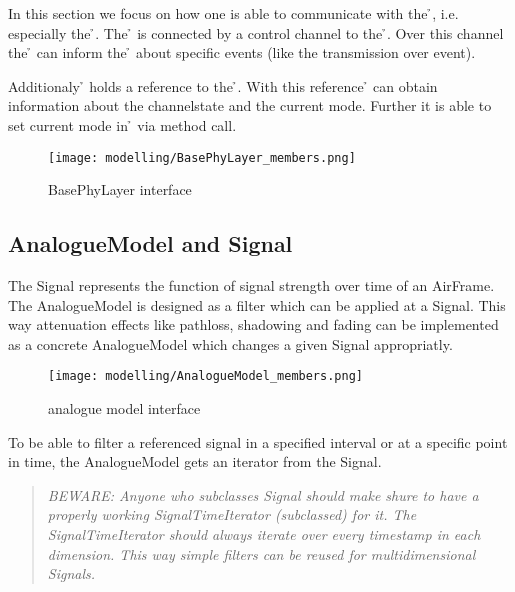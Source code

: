 In this section we focus on how one is able to communicate with the \h{\basePhyLayer}, i.e. 
especially the \h{\baseMacLayer}. 
The \h{\baseMacLayer} is connected by a control channel to the \h{\basePhyLayer}. Over this channel the 
\h{\basePhyLayer} can inform the \h{\baseMacLayer} about specific events (like the transmission over event).

Additionaly \h{\baseMacLayer} holds a reference to the \h{\basePhyLayer}. With this reference \h{\baseMacLayer} can obtain information about the channelstate and the current mode. Further it is able to set current mode in \h{\basePhyLayer} via method call.

\begin{figure}[H]
 \centering
 \texttt{[image: modelling/BasePhyLayer\_members.png]}
 \caption{BasePhyLayer interface}
 \label{fig: BasePhyLayer interface}
\end{figure}
\newpage


\subsection{AnalogueModel and Signal}

The Signal represents the function of signal strength over time of an AirFrame. 
The AnalogueModel is designed as a filter which can be applied at a Signal.
This way attenuation effects like pathloss, shadowing and fading can be implemented as a concrete AnalogueModel which changes a given Signal appropriatly.

\begin{figure}[H]
 \centering
 \texttt{[image: modelling/AnalogueModel\_members.png]}
 \caption{analogue model interface}
 \label{fig: analogue model interface}
\end{figure}

To be able to filter a referenced signal in a specified interval or at a specific point in time, the AnalogueModel gets an iterator from the Signal.

\begin{quote}
\emph{BEWARE: Anyone who subclasses Signal should make shure to have a properly
working SignalTimeIterator (subclassed) for it. The SignalTimeIterator should always
iterate over \textit{every} timestamp in each dimension. This way simple filters can be reused for multidimensional Signals.}
\end{quote}

